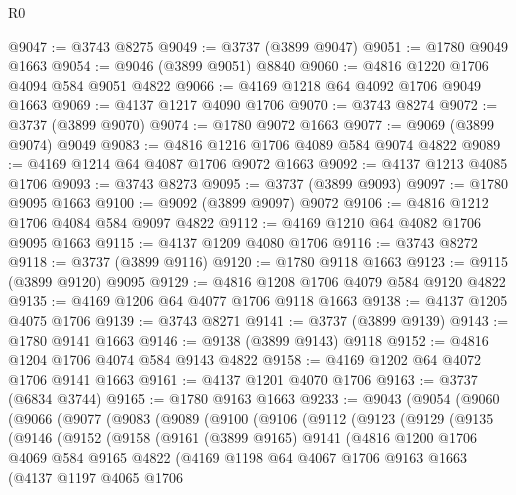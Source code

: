 \begin{lexlean}{R0}
\begin{coremodule}
@9047 := @3743 @8275
@9049 := @3737 (@3899 @9047)
@9051 := @1780 @9049 @1663
@9054 := @9046 (@3899 @9051) @8840
@9060 := @4816 @1220 @1706 @4094 @584 @9051 @4822
@9066 := @4169 @1218 @64 @4092 @1706 @9049 @1663
@9069 := @4137 @1217 @4090 @1706
@9070 := @3743 @8274
@9072 := @3737 (@3899 @9070)
@9074 := @1780 @9072 @1663
@9077 := @9069 (@3899 @9074) @9049
@9083 := @4816 @1216 @1706 @4089 @584 @9074 @4822
@9089 := @4169 @1214 @64 @4087 @1706 @9072 @1663
@9092 := @4137 @1213 @4085 @1706
@9093 := @3743 @8273
@9095 := @3737 (@3899 @9093)
@9097 := @1780 @9095 @1663
@9100 := @9092 (@3899 @9097) @9072
@9106 := @4816 @1212 @1706 @4084 @584 @9097 @4822
@9112 := @4169 @1210 @64 @4082 @1706 @9095 @1663
@9115 := @4137 @1209 @4080 @1706
@9116 := @3743 @8272
@9118 := @3737 (@3899 @9116)
@9120 := @1780 @9118 @1663
@9123 := @9115 (@3899 @9120) @9095
@9129 := @4816 @1208 @1706 @4079 @584 @9120 @4822
@9135 := @4169 @1206 @64 @4077 @1706 @9118 @1663
@9138 := @4137 @1205 @4075 @1706
@9139 := @3743 @8271
@9141 := @3737 (@3899 @9139)
@9143 := @1780 @9141 @1663
@9146 := @9138 (@3899 @9143) @9118
@9152 := @4816 @1204 @1706 @4074 @584 @9143 @4822
@9158 := @4169 @1202 @64 @4072 @1706 @9141 @1663
@9161 := @4137 @1201 @4070 @1706
@9163 := @3737 (@6834 @3744)
@9165 := @1780 @9163 @1663
@9233 := @9043
    (@9054
      (@9060
        (@9066
          (@9077
            (@9083
              (@9089
                (@9100
                  (@9106
                    (@9112
                      (@9123
                        (@9129
                          (@9135
                            (@9146
                              (@9152
                                (@9158
                                  (@9161
                                    (@3899 @9165)
                                    @9141
                                    (@4816
                                      @1200
                                      @1706
                                      @4069
                                      @584
                                      @9165
                                      @4822
                                      (@4169
                                        @1198
                                        @64
                                        @4067
                                        @1706
                                        @9163
                                        @1663
                                        (@4137
                                          @1197
                                          @4065
                                          @1706

\end{coremodule}
\end{lexlean}
